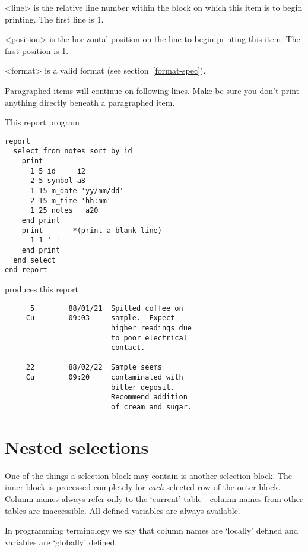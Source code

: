 \begin{List}
\item[<line>] is the relative line number within the block on which
  this item is to begin printing.
  The first line is 1.
\item[<position>] is the horizontal position on the line
  to begin printing this item.
  The first position is 1.
\item[<format>] is a valid format (see section~\ref{format-spec}).
\end{List}
 
Paragraphed items will continue on following lines.
Make be sure you don't print anything directly beneath a paragraphed item.
 
\demobreak
This report program
\begin{verbatim}
report
  select from notes sort by id
    print
      1 5 id     i2
      2 5 symbol a8
      1 15 m_date 'yy/mm/dd'
      2 15 m_time 'hh:mm'
      1 25 notes   a20
    end print
    print       *(print a blank line)
      1 1 ' '
    end print
  end select
end report
\end{verbatim}
\demobreak
produces this report
 
\Rimdisp
\begin{verbatim}
      5        88/01/21  Spilled coffee on
     Cu        09:03     sample.  Expect
                         higher readings due
                         to poor electrical
                         contact.
 
     22        88/02/22  Sample seems
     Cu        09:20     contaminated with
                         bitter deposit.
                         Recommend addition
                         of cream and sugar.
\end{verbatim}
\enddisp
\label{para-demo}
 
 
\section{Nested selections}
%
One of the things a selection block may contain is another
selection block.
The inner block is processed completely for {\em each} selected
row of the outer block.
Column names always refer only to the `current' table---column
names from other tables are inaccessible.  All defined
variables are always available.
 
 
In programming terminology we say that column names are `locally'
defined and variables are `globally' defined.
 

